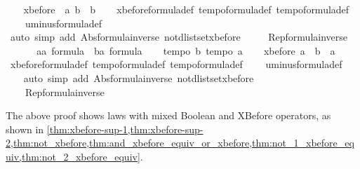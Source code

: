 \begin{isabellebody}
\ \ \isamarkupfalse%
\ {\isachardoublequoteopen}xbefore\ {\isacharparenleft}{\isacharminus}\ a{\isacharparenright}\ b\ {\isacharequal}\ b{\isachardoublequoteclose}\isanewline
\ \ \isamarkupfalse%
\ xbefore{\isacharunderscore}formula{\isacharunderscore}def\ tempo{}{\isacharunderscore}formula{\isacharunderscore}def\ tempo{}{\isacharunderscore}formula{\isacharunderscore}def\isanewline
\ \ \ \ uminus{\isacharunderscore}formula{\isacharunderscore}def\ \isanewline
\ \ \isamarkupfalse%
\ {\isacharparenleft}auto\ simp\ add{\isacharcolon}\ Abs{\isacharunderscore}formula{\isacharunderscore}inverse\ not{\isacharunderscore}{}{\isacharunderscore}dlistset{\isacharunderscore}xbefore\ \isanewline
\ \ \ \ Rep{\isacharunderscore}formula{\isacharunderscore}inverse{\isacharparenright}\isanewline
\ \ \isamarkupfalse%
\isanewline
\ \ \isamarkupfalse%
\ a{\isacharcolon}{\isacharcolon}{\isachardoublequoteopen}{\isacharprime}a\ formula{\isachardoublequoteclose}\ \ b{\isacharcolon}{\isacharcolon}{\isachardoublequoteopen}{\isacharprime}a\ formula{\isachardoublequoteclose}\isanewline
\ \ \isamarkupfalse%
\ {\isachardoublequoteopen}tempo{}\ b{\isachardoublequoteclose}\ {\isachardoublequoteopen}tempo{}\ a{\isachardoublequoteclose}\isanewline
\ \ \isamarkupfalse%
\ {\isachardoublequoteopen}xbefore\ a\ {\isacharparenleft}{\isacharminus}\ b{\isacharparenright}\ {\isacharequal}\ a{\isachardoublequoteclose}\isanewline
\ \ \isamarkupfalse%
\ xbefore{\isacharunderscore}formula{\isacharunderscore}def\ tempo{}{\isacharunderscore}formula{\isacharunderscore}def\ tempo{}{\isacharunderscore}formula{\isacharunderscore}def\isanewline
\ \ \ \ uminus{\isacharunderscore}formula{\isacharunderscore}def\ \isanewline
\ \ \isamarkupfalse%
\ {\isacharparenleft}auto\ simp\ add{\isacharcolon}\ Abs{\isacharunderscore}formula{\isacharunderscore}inverse\ not{\isacharunderscore}{}{\isacharunderscore}dlistset{\isacharunderscore}xbefore\ \isanewline
\ \ \ \ Rep{\isacharunderscore}formula{\isacharunderscore}inverse{\isacharparenright}\isanewline
{}\isamarkupfalse%
%
\endisatagproof
{\isafoldproof}%
%
\isadelimproof
%
\endisadelimproof
%
\begin{isamarkuptext}%
The above proof shows laws with mixed Boolean and \ac{XBefore} operators, as shown in \cref{thm:xbefore-sup-1,thm:xbefore-sup-2,thm:not_xbefore,thm:and_xbefore_equiv_or_xbefore,thm:not_1_xbefore_equiv,thm:not_2_xbefore_equiv}.%

\end{isamarkuptext}
\end{isabellebody}
